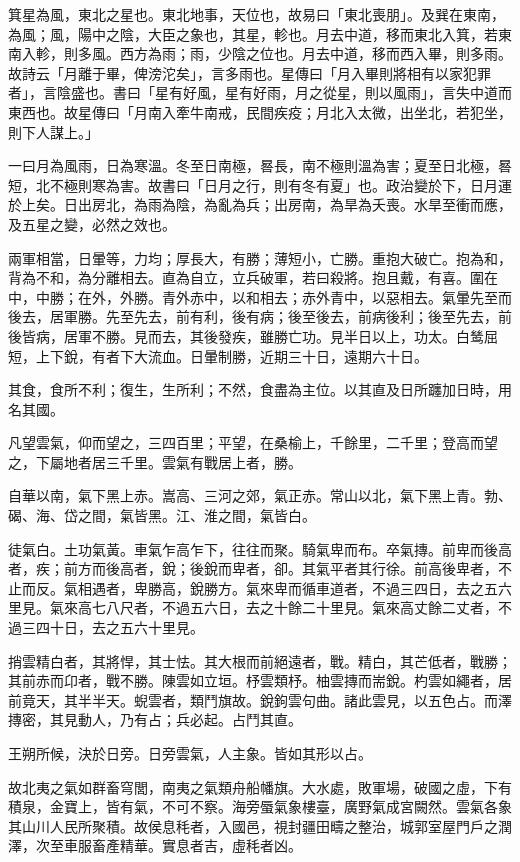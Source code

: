 \begin{pinyinscope}
箕星為風，東北之星也。東北地事，天位也，故易曰「東北喪朋」。及巽在東南，為風；風，陽中之陰，大臣之象也，其星，軫也。月去中道，移而東北入箕，若東南入軫，則多風。西方為雨；雨，少陰之位也。月去中道，移而西入畢，則多雨。故詩云「月離于畢，俾滂沱矣」，言多雨也。星傳曰「月入畢則將相有以家犯罪者」，言陰盛也。書曰「星有好風，星有好雨，月之從星，則以風雨」，言失中道而東西也。故星傳曰「月南入牽牛南戒，民間疾疫；月北入太微，出坐北，若犯坐，則下人謀上。」

一曰月為風雨，日為寒溫。冬至日南極，晷長，南不極則溫為害；夏至日北極，晷短，北不極則寒為害。故書曰「日月之行，則有冬有夏」也。政治變於下，日月運於上矣。日出房北，為雨為陰，為亂為兵；出房南，為旱為夭喪。水旱至衝而應，及五星之變，必然之效也。

兩軍相當，日暈等，力均；厚長大，有勝；薄短小，亡勝。重抱大破亡。抱為和，背為不和，為分離相去。直為自立，立兵破軍，若曰殺將。抱且戴，有喜。圍在中，中勝；在外，外勝。青外赤中，以和相去；赤外青中，以惡相去。氣暈先至而後去，居軍勝。先至先去，前有利，後有病；後至後去，前病後利；後至先去，前後皆病，居軍不勝。見而去，其後發疾，雖勝亡功。見半日以上，功太。白鸶屈短，上下銳，有者下大流血。日暈制勝，近期三十日，遠期六十日。

其食，食所不利；復生，生所利；不然，食盡為主位。以其直及日所躔加日時，用名其國。

凡望雲氣，仰而望之，三四百里；平望，在桑榆上，千餘里，二千里；登高而望之，下屬地者居三千里。雲氣有戰居上者，勝。

自華以南，氣下黑上赤。嵩高、三河之郊，氣正赤。常山以北，氣下黑上青。勃、碣、海、岱之間，氣皆黑。江、淮之間，氣皆白。

徒氣白。土功氣黃。車氣乍高乍下，往往而聚。騎氣卑而布。卒氣摶。前卑而後高者，疾；前方而後高者，銳；後銳而卑者，卻。其氣平者其行徐。前高後卑者，不止而反。氣相遇者，卑勝高，銳勝方。氣來卑而循車道者，不過三四日，去之五六里見。氣來高七八尺者，不過五六日，去之十餘二十里見。氣來高丈餘二丈者，不過三四十日，去之五六十里見。

捎雲精白者，其將悍，其士怯。其大根而前絕遠者，戰。精白，其芒低者，戰勝；其前赤而卬者，戰不勝。陳雲如立垣。杼雲類杼。柚雲摶而耑銳。杓雲如繩者，居前竟天，其半半天。蜺雲者，類鬥旗故。銳鉤雲句曲。諸此雲見，以五色占。而澤摶密，其見動人，乃有占；兵必起。占鬥其直。

王朔所候，決於日旁。日旁雲氣，人主象。皆如其形以占。

故北夷之氣如群畜穹閭，南夷之氣類舟船幡旗。大水處，敗軍場，破國之虛，下有積泉，金寶上，皆有氣，不可不察。海旁蜃氣象樓臺，廣野氣成宮闕然。雲氣各象其山川人民所聚積。故侯息秏者，入國邑，視封疆田疇之整治，城郭室屋門戶之潤澤，次至車服畜產精華。實息者吉，虛秏者凶。


\end{pinyinscope}
